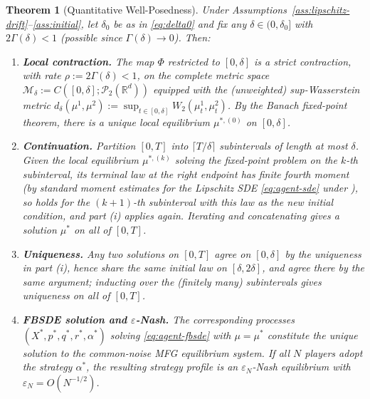 \documentclass[11pt]{article}
\newtheorem{theorem}{Theorem}[section]
\theoremstyle{remark}
\begin{document}
\begin{theorem}[Quantitative Well-Posedness]
\label{thm:wellposedness}
Under Assumptions~\ref{ass:lipschitz-drift}--\ref{ass:initial}, let $\delta_0$ be as
in \eqref{eq:delta0} and fix any $\delta \in (0,\delta_0]$ with $2\Gamma(\delta) < 1$
(possible since $\Gamma(\delta) \to 0$). Then:
\begin{enumerate}[label=(\roman*)]
    \item \textbf{Local contraction.} The map $\Phi$ restricted to $[0,\delta]$ is a
    strict contraction, with rate $\rho := 2\Gamma(\delta) < 1$, on the complete
    metric space $\mathcal{M}_\delta := C([0,\delta];\mathcal{P}_2(\mathbb{R}^d))$
    equipped with the (unweighted) sup-Wasserstein metric
    $d_\delta(\mu^1,\mu^2) := \sup_{t\in[0,\delta]} W_2(\mu_t^1,\mu_t^2)$. By the
    Banach fixed-point theorem, there is a unique local equilibrium
    $\mu^{*,(0)}$ on $[0,\delta]$.

    \item \textbf{Continuation.} Partition $[0,T]$ into $\lceil T/\delta\rceil$
    subintervals of length at most $\delta$. Given the local equilibrium
    $\mu^{*,(k)}$ solving the fixed-point problem on the $k$-th subinterval, its
    terminal law at the right endpoint has finite fourth moment (by standard moment
    estimates for the Lipschitz SDE \eqref{eq:agent-sde} under
    ), so  holds for the
    $(k{+}1)$-th subinterval with this law as the new initial condition, and part
    (i) applies again. Iterating and concatenating gives a solution $\mu^*$ on all
    of $[0,T]$.

    \item \textbf{Uniqueness.} Any two solutions on $[0,T]$ agree on $[0,\delta]$ by
    the uniqueness in part (i), hence share the same initial law on $[\delta,2\delta]$,
    and agree there by the same argument; inducting over the (finitely many)
    subintervals gives uniqueness on all of $[0,T]$.

    \item \textbf{FBSDE solution and $\varepsilon$-Nash.} The corresponding processes
    $(X^*,p^*,q^*,r^*,\alpha^*)$ solving \eqref{eq:agent-fbsde} with $\mu=\mu^*$
    constitute the unique solution to the common-noise MFG equilibrium system. If
    all $N$ players adopt the strategy $\alpha^*$, the resulting strategy profile is
    an $\varepsilon_N$-Nash equilibrium with $\varepsilon_N = O(N^{-1/2})$.
\end{enumerate}
\end{theorem}
\end{document}
